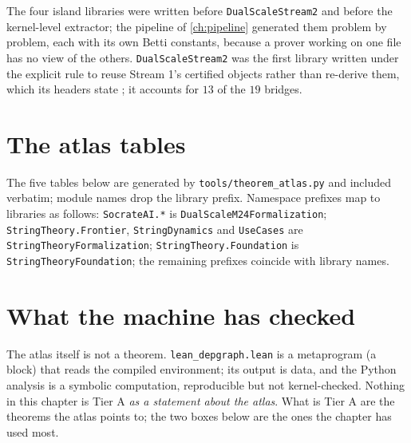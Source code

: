 \begin{historybox}
The four island libraries were written before \texttt{DualScaleStream2} and before the
kernel-level extractor; the pipeline of \cref{ch:pipeline} generated them problem by
problem, each with its own Betti constants, because a prover working on one file has no
view of the others. \texttt{DualScaleStream2} was the first library written under the
explicit rule to reuse Stream 1's certified objects rather than re-derive them, which its
headers state ; it accounts for $13$ of the $19$
bridges.
\end{historybox}

\section{The atlas tables}\label{sec:atlas:tables}

The five tables below are generated by \texttt{tools/theorem\_atlas.py} and included
verbatim; module names drop the library prefix. Namespace prefixes map to libraries as
follows: \texttt{SocrateAI.*} is \texttt{DualScaleM24Formalization};
\texttt{StringTheory.Frontier}, \texttt{StringDynamics} and \texttt{UseCases} are
\texttt{StringTheoryFormalization}; \texttt{StringTheory.Foundation} is
\texttt{StringTheoryFoundation}; the remaining prefixes coincide with library names.

{\tabcolsep=2.5pt\def\_{\textunderscore\allowbreak}}

\section{What the machine has checked}\label{sec:atlas:lean}

The atlas itself is not a theorem. \texttt{lean\_depgraph.lean} is a metaprogram (a
 block) that reads the compiled environment; its output is data, and the
Python analysis is a symbolic computation, reproducible but not kernel-checked. Nothing
in this chapter is Tier A \emph{as a statement about the atlas}. What is Tier A are the
theorems the atlas points to; the two boxes below are the ones the chapter has used most.

